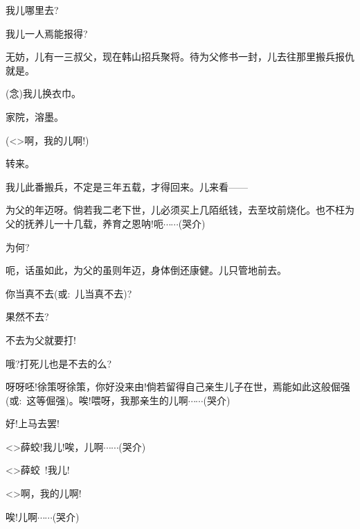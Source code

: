 {


我儿哪里去?

我儿一人焉能报得?

无妨，儿有一三叔父，现在韩山招兵聚将。待为父修书一封，儿去往那里搬兵报仇就是。

({\akai 念})我儿换衣巾。

家院，溶墨。




(\textless{}\!\textgreater{}啊，我的儿啊!)

转来。

我儿此番搬兵，不定是三年五载，才得回来。儿来看------

为父的年迈呀。倘若我二老下世，儿必须买上几陌纸钱，去至坟前烧化。也不枉为父的抚养儿一十几载，养育之恩呐!呃$\cdots{}\cdots{}$({\hwfs 哭介})

为何?

呃，话虽如此，为父的虽则年迈，身体倒还康健。儿只管地前去。

你当真不去({\akai 或}:~儿当真不去)?

果然不去?

不去为父就要打!

哦?打死儿也是不去的么?

呀呀呸!徐策呀徐策，你好没来由!倘若留得自己亲生儿子在世，焉能如此这般倔强({\akai 或}:~这等倔强)。唉!喂呀，我那亲生的儿啊$\cdots{}\cdots{}$({\hwfs 哭介})

好!上马去罢!

\textless{}\!\textgreater{}薛蛟!我儿!唉，儿啊$\cdots{}\cdots{}$({\hwfs 哭介})

\textless{}\!\textgreater{}薛蛟~!我儿!

\textless{}\!\textgreater{}啊，我的儿啊!


唉!儿啊$\cdots{}\cdots{}$({\hwfs 哭介})

}
